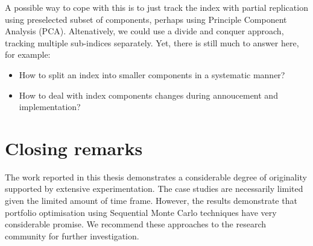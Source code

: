 A possible way to cope with this is to just track the index with partial replication using preselected subset of components, perhaps using Principle Component Analysis (PCA). Altenatively, we could use a divide and conquer approach, tracking multiple sub-indices separately. Yet, there is still much to answer here, for example:
\begin{itemize}
\item How to split an index into smaller components in a systematic manner?
\item How to deal with index components changes during annoucement and implementation?
\end{itemize}

\section{Closing remarks}
\label{ClosingRemark}
The work reported in this thesis demonstrates a considerable degree of
originality supported by extensive experimentation. The case studies
are necessarily limited given the limited amount of time frame.  However, the results
 demonstrate that portfolio optimisation using Sequential Monte Carlo techniques have very considerable promise. We recommend these approaches to
the research community for further investigation.





